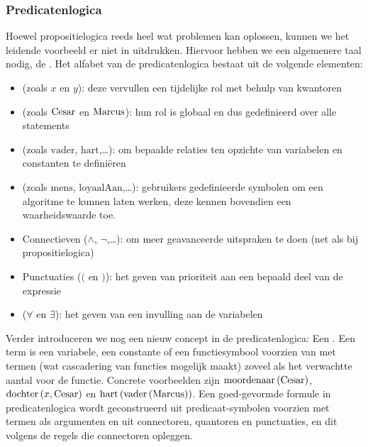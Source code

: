 \subsubsection{Predicatenlogica}
Hoewel propositielogica reeds heel wat problemen kan oplossen, kunnen we het leidende voorbeeld er niet in uitdrukken. Hiervoor hebben we een algemenere taal nodig, de . Het alfabet van de predicatenlogica bestaat uit de volgende elementen:
\begin{itemize}
 \item {} (zoals $x$ en $y$): deze vervullen een tijdelijke rol met behulp van kwantoren
 \item {} (zoals $\mbox{Cesar}$ en $\mbox{Marcus}$): hun rol is globaal en dus gedefinieerd over alle statements
 \item {} (zoals $\mbox{vader}$, $\mbox{hart}$,\dots): om bepaalde relaties ten opzichte van variabelen en constanten te definiëren
 \item {} (zoals $\mbox{mens}$, $\mbox{loyaalAan}$,\dots): gebruikers gedefinieerde symbolen om een algoritme te kunnen laten werken, deze kennen bovendien een waarheidswaarde toe.
 \item Connectieven ($\wedge$, $\neg$,\dots): om meer geavanceerde uitspraken te doen (net als bij propositielogica)
 \item Punctuaties ($($ en $)$): het geven van prioriteit aan een bepaald deel van de expressie
 \item {} ($\forall$ en $\exists$): het geven van een invulling aan de variabelen
\end{itemize}
Verder introduceren we nog een nieuw concept in de predicatenlogica: Een . Een term is een variabele, een constante of een functiesymbool voorzien van met termen (wat cascadering van functies mogelijk maakt) zoveel als het verwachtte aantal voor de functie. Concrete voorbeelden zijn $\mbox{moordenaar}\left( \mbox{Cesar} \right)$, $\mbox{dochter}\left( x,\mbox{Cesar} \right)$ en $\mbox{hart}\left( \mbox{vader}\left( \mbox{Marcus} \right) \right)$. Een goed-gevormde formule in predicatenlogica wordt geconstrueerd uit predicaat-symbolen voorzien met termen als argumenten en uit connectoren, quantoren en punctuaties, en dit volgens de regels die connectoren opleggen.
